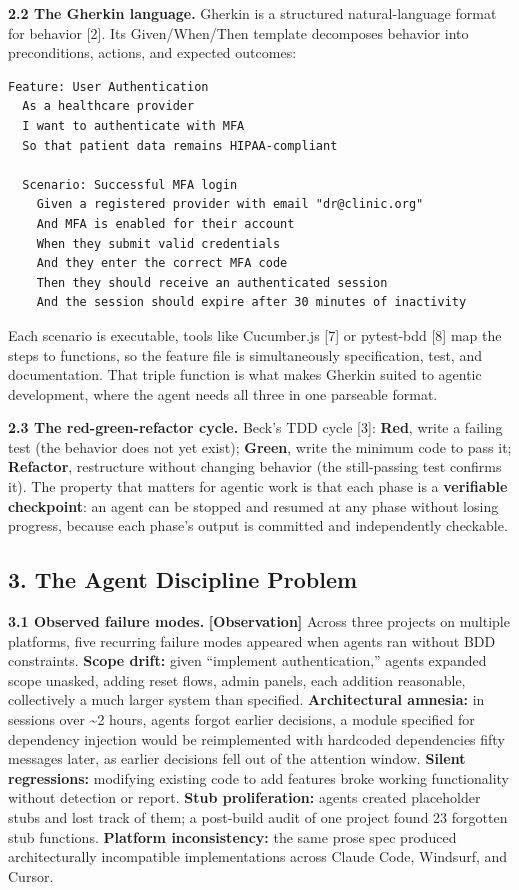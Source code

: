 \textbf{2.2 The Gherkin language.} Gherkin is a structured
natural-language format for behavior {[}2{]}. Its Given/When/Then
template decomposes behavior into preconditions, actions, and expected
outcomes:

\begin{verbatim}
Feature: User Authentication
  As a healthcare provider
  I want to authenticate with MFA
  So that patient data remains HIPAA-compliant

  Scenario: Successful MFA login
    Given a registered provider with email "dr@clinic.org"
    And MFA is enabled for their account
    When they submit valid credentials
    And they enter the correct MFA code
    Then they should receive an authenticated session
    And the session should expire after 30 minutes of inactivity
\end{verbatim}

Each scenario is executable, tools like Cucumber.js {[}7{]} or
pytest-bdd {[}8{]} map the steps to functions, so the feature file is
simultaneously specification, test, and documentation. That triple
function is what makes Gherkin suited to agentic development, where the
agent needs all three in one parseable format.

\textbf{2.3 The red-green-refactor cycle.} Beck's TDD cycle {[}3{]}:
\textbf{Red}, write a failing test (the behavior does not yet exist);
\textbf{Green}, write the minimum code to pass it; \textbf{Refactor},
restructure without changing behavior (the still-passing test confirms
it). The property that matters for agentic work is that each phase is a
\textbf{verifiable checkpoint}: an agent can be stopped and resumed at
any phase without losing progress, because each phase's output is
committed and independently checkable.

\subsection{3. The Agent Discipline
Problem}\label{the-agent-discipline-problem}

\textbf{3.1 Observed failure modes.} \textbf{{[}Observation{]}} Across
three projects on multiple platforms, five recurring failure modes
appeared when agents ran without BDD constraints. \textbf{Scope drift:}
given ``implement authentication,'' agents expanded scope unasked,
adding reset flows, admin panels, each addition reasonable, collectively
a much larger system than specified. \textbf{Architectural amnesia:} in
sessions over \textasciitilde2 hours, agents forgot earlier decisions, a
module specified for dependency injection would be reimplemented with
hardcoded dependencies fifty messages later, as earlier decisions fell
out of the attention window. \textbf{Silent regressions:} modifying
existing code to add features broke working functionality without
detection or report. \textbf{Stub proliferation:} agents created
placeholder stubs and lost track of them; a post-build audit of one
project found 23 forgotten stub functions. \textbf{Platform
inconsistency:} the same prose spec produced architecturally
incompatible implementations across Claude Code, Windsurf, and Cursor.

